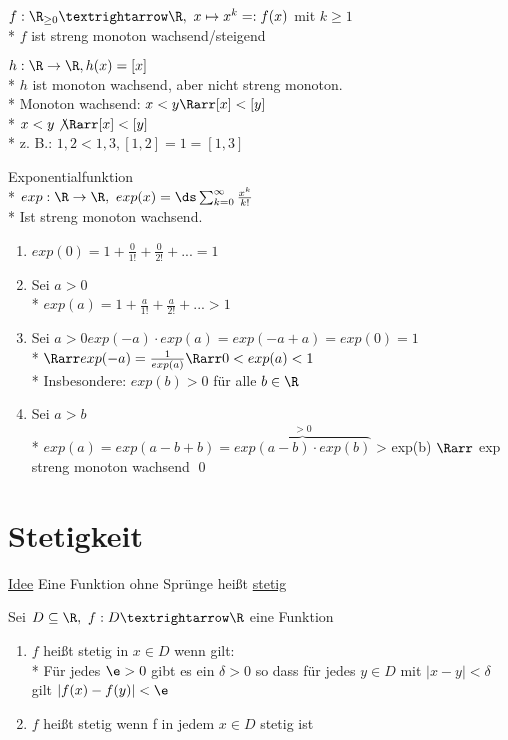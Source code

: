 \begin{enumerate}
\item{$f:\R_{\geq 0}→\R,\ x\mapsto x^k =:f(x)$ mit $k\geq 1$\\*
$f$ ist streng monoton wachsend/steigend 
\item{$h: \R \to \R, h(x) = [x]$}\\*
$h$ ist monoton wachsend, aber nicht streng monoton.\\*
Monoton wachsend: $x < y \Rarr [x] < [y]$\\*
$x < y \not\Rarr [x] < [y]$\\*
z. B.: $1,2 < 1,3 , [1,2] = 1 = [1,3] $}
\item{Exponentialfunktion\\*
$exp: \R \to \R,\ exp(x)= \ds\sum_{k=0}^{\infty} \frac{x^k}{k!}$\\*
Ist streng monoton wachsend.
\bew
\begin{enumerate}
\item{$exp(0) = 1 + \frac{0}{1!} + \frac{0}{2!} + ... = 1$}
\item{Sei $a > 0$\\*
$exp(a) = 1 + \frac{a}{1!} + \frac{a}{2!} + ... > 1$}
\item{Sei $a > 0 exp(-a) \cdot exp(a) = exp(-a + a) = exp(0) = 1$\\*
$\Rarr exp(-a) = \frac{1}{exp(a)} \Rarr 0 < exp(a) < 1$\\*
Insbesondere: $exp(b) > 0$ für alle $b \in \R$}
\item{Sei $a > b$\\*
$exp(a) = exp(a - b + b) = \overbrace{exp(a - b) \cdot exp(b)}^{>0}$
> exp(b) $\Rarr$ exp streng monoton wachsend \qed }
\end{enumerate}
}
\end{enumerate}

\chapter{Stetigkeit}
\ul{Idee} Eine Funktion ohne Sprünge heißt \ul{stetig}

Sei $D\subseteq \R,\ f:D→\R$ eine Funktion
\begin{enumerate}
\item{$f$ heißt stetig in $x\in D$ wenn gilt:\\*
Für jedes $\e>0$ gibt es ein $\delta>0$ so dass für jedes $y\in D$ mit $|x-y|<\delta$ gilt $|f(x)-f(y)|<\e$ %
}
\item{$f$ heißt stetig wenn f in jedem $x\in D$ stetig ist}
\end{enumerate}

